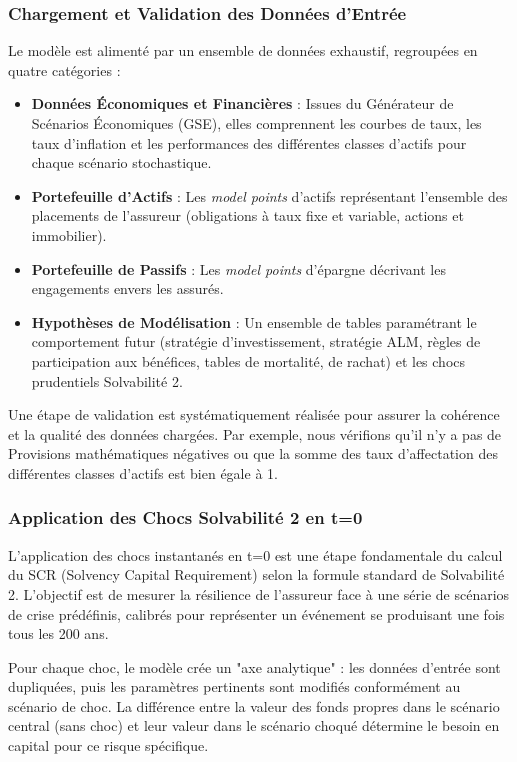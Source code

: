 \subsubsection{Chargement et Validation des Données d'Entrée}

Le modèle est alimenté par un ensemble de données exhaustif, regroupées en quatre catégories :
\begin{itemize}
\item \textbf{Données Économiques et Financières} : Issues du Générateur de Scénarios Économiques (GSE), elles comprennent les courbes de taux, les taux d'inflation et les performances des différentes classes d'actifs pour chaque scénario stochastique.
\item \textbf{Portefeuille d'Actifs} : Les \textit{model points} d'actifs représentant l'ensemble des placements de l'assureur (obligations à taux fixe et variable, actions et immobilier).
\item \textbf{Portefeuille de Passifs} : Les \textit{model points} d'épargne décrivant les engagements envers les assurés.
\item \textbf{Hypothèses de Modélisation} : Un ensemble de tables paramétrant le comportement futur (stratégie d'investissement, stratégie ALM, règles de participation aux bénéfices, tables de mortalité, de rachat) et les chocs prudentiels Solvabilité 2.
\end{itemize}
Une étape de validation est systématiquement réalisée pour assurer la cohérence et la qualité des données chargées. Par exemple, nous vérifions qu'il n'y a pas de Provisions mathématiques négatives ou que la somme des taux d'affectation des différentes classes d'actifs est bien égale à 1.

\subsubsection{Application des Chocs Solvabilité 2 en t=0}

L'application des chocs instantanés en t=0 est une étape fondamentale du calcul du SCR (Solvency Capital Requirement) selon la formule standard de Solvabilité 2. L'objectif est de mesurer la résilience de l'assureur face à une série de scénarios de crise prédéfinis, calibrés pour représenter un événement se produisant une fois tous les 200 ans.

Pour chaque choc, le modèle crée un "axe analytique" : les données d'entrée sont dupliquées, puis les paramètres pertinents sont modifiés conformément au scénario de choc. La différence entre la valeur des fonds propres dans le scénario central (sans choc) et leur valeur dans le scénario choqué détermine le besoin en capital pour ce risque spécifique.

